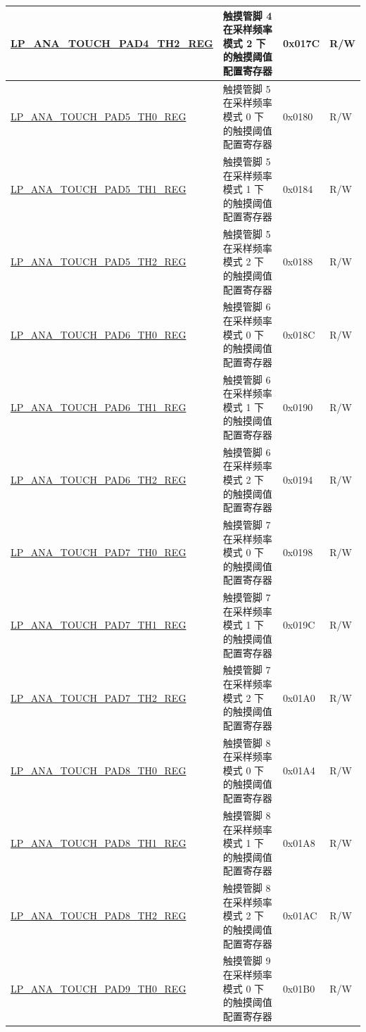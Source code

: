 \begin{longtable}{ | l| p{10cm} | p{1.3cm} | p{1cm} | }
\hyperref[regdesc:LPANATOUCHPAD0TH2REG]{LP\_ANA\_TOUCH\_PAD4\_TH2\_REG} & 触摸管脚 4 在采样频率模式 2 下的触摸阈值配置寄存器 & 0x017C & R/W \\ \hline
\hyperref[regdesc:LPANATOUCHPAD0TH0REG]{LP\_ANA\_TOUCH\_PAD5\_TH0\_REG} & 触摸管脚 5 在采样频率模式 0 下的触摸阈值配置寄存器 & 0x0180 & R/W \\ \hline
\hyperref[regdesc:LPANATOUCHPAD0TH1REG]{LP\_ANA\_TOUCH\_PAD5\_TH1\_REG} & 触摸管脚 5 在采样频率模式 1 下的触摸阈值配置寄存器 & 0x0184 & R/W \\ \hline
\hyperref[regdesc:LPANATOUCHPAD0TH2REG]{LP\_ANA\_TOUCH\_PAD5\_TH2\_REG} & 触摸管脚 5 在采样频率模式 2 下的触摸阈值配置寄存器 & 0x0188 & R/W \\ \hline
\hyperref[regdesc:LPANATOUCHPAD0TH0REG]{LP\_ANA\_TOUCH\_PAD6\_TH0\_REG} & 触摸管脚 6 在采样频率模式 0 下的触摸阈值配置寄存器 & 0x018C & R/W \\ \hline
\hyperref[regdesc:LPANATOUCHPAD0TH1REG]{LP\_ANA\_TOUCH\_PAD6\_TH1\_REG} & 触摸管脚 6 在采样频率模式 1 下的触摸阈值配置寄存器 & 0x0190 & R/W \\ \hline
\hyperref[regdesc:LPANATOUCHPAD0TH2REG]{LP\_ANA\_TOUCH\_PAD6\_TH2\_REG} & 触摸管脚 6 在采样频率模式 2 下的触摸阈值配置寄存器 & 0x0194 & R/W \\ \hline
\hyperref[regdesc:LPANATOUCHPAD0TH0REG]{LP\_ANA\_TOUCH\_PAD7\_TH0\_REG} & 触摸管脚 7 在采样频率模式 0 下的触摸阈值配置寄存器 & 0x0198 & R/W \\ \hline
\hyperref[regdesc:LPANATOUCHPAD0TH1REG]{LP\_ANA\_TOUCH\_PAD7\_TH1\_REG} & 触摸管脚 7 在采样频率模式 1 下的触摸阈值配置寄存器 & 0x019C & R/W \\ \hline
\hyperref[regdesc:LPANATOUCHPAD0TH2REG]{LP\_ANA\_TOUCH\_PAD7\_TH2\_REG} & 触摸管脚 7 在采样频率模式 2 下的触摸阈值配置寄存器 & 0x01A0 & R/W \\ \hline
\hyperref[regdesc:LPANATOUCHPAD0TH0REG]{LP\_ANA\_TOUCH\_PAD8\_TH0\_REG} & 触摸管脚 8 在采样频率模式 0 下的触摸阈值配置寄存器 & 0x01A4 & R/W \\ \hline
\hyperref[regdesc:LPANATOUCHPAD0TH1REG]{LP\_ANA\_TOUCH\_PAD8\_TH1\_REG} & 触摸管脚 8 在采样频率模式 1 下的触摸阈值配置寄存器 & 0x01A8 & R/W \\ \hline
\hyperref[regdesc:LPANATOUCHPAD0TH2REG]{LP\_ANA\_TOUCH\_PAD8\_TH2\_REG} & 触摸管脚 8 在采样频率模式 2 下的触摸阈值配置寄存器 & 0x01AC & R/W \\ \hline
\hyperref[regdesc:LPANATOUCHPAD0TH0REG]{LP\_ANA\_TOUCH\_PAD9\_TH0\_REG} & 触摸管脚 9 在采样频率模式 0 下的触摸阈值配置寄存器 & 0x01B0 & R/W \\ \hline

\end{longtable}
